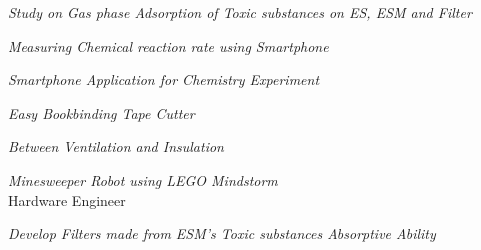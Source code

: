 \documentclass[a4paper,12pt]{memoir} %
\begin{document}

{\textit{Study on Gas phase Adsorption of Toxic substances on ES, ESM and Filter}}



{\textit{Measuring Chemical reaction rate using Smartphone}}



{\textit{Smartphone Application for Chemistry Experiment}}



{\textit{Easy Bookbinding Tape Cutter}}



{\textit{Between Ventilation and Insulation}}



{\textit{Minesweeper Robot using LEGO Mindstorm}\\{Hardware Engineer}}



{\textit{Develop Filters made from ESM's Toxic substances Absorptive Ability}}


\Sep %
\end{document}
